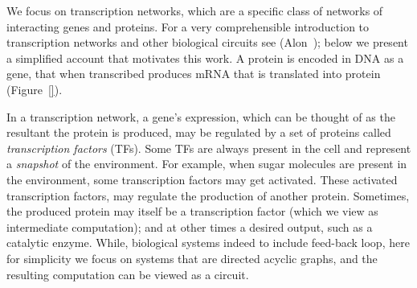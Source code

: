 We focus on transcription networks, which are a specific class of networks of
interacting genes and proteins. For a very comprehensible introduction to
transcription networks and other biological circuits see (Alon~\cite{alon});
below we present a simplified account that motivates this work. A protein is
encoded in DNA as a gene, that when transcribed produces mRNA that is translated
into protein (Figure~\ref{}).


In a transcription network, a gene's expression, which can be thought of as the
 resultant the protein is produced, may be
regulated by a set of proteins called \emph{transcription factors} (TFs). Some
TFs are always present in the cell and represent a \emph{snapshot} of the
environment. For example, when sugar molecules are present in the environment,
some transcription factors may get activated. These activated transcription
factors, may regulate the production of another protein. Sometimes, the produced
protein may itself be a transcription factor (which we view as intermediate
computation); and at other times a desired output, such as a catalytic enzyme.
While, biological systems indeed to include feed-back loop, here for simplicity
we focus on systems that are directed acyclic graphs, and the resulting
computation can be viewed as a circuit.


